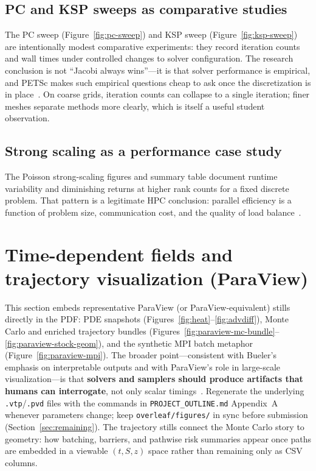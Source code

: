 \documentclass[11pt]{article}
\begin{document}
\subsection{PC and KSP sweeps as comparative studies}
The PC sweep (Figure~\ref{fig:pc-sweep}) and KSP sweep (Figure~\ref{fig:ksp-sweep})
are intentionally modest comparative experiments: they record iteration
counts and wall times under controlled changes to solver configuration. The
research conclusion is not ``Jacobi always wins''---it is that solver
performance is empirical, and PETSc makes such empirical questions cheap to ask
once the discretization is in place~\cite{bueler2020petsc,petsc-user-ref}. On coarse
grids, iteration counts can collapse to a single iteration; finer meshes separate
methods more clearly, which is itself a useful student observation.

\subsection{Strong scaling as a performance case study}
The Poisson strong-scaling figures and summary table document runtime variability
and diminishing returns at higher rank counts for a fixed discrete problem. That
pattern is a legitimate HPC conclusion: parallel efficiency is a function of problem
size, communication cost, and the quality of load balance~\cite{petsc-efficient}.

\section{Time-dependent fields and trajectory visualization (ParaView)}
This section embeds representative ParaView (or ParaView-equivalent) stills
directly in the PDF: PDE snapshots (Figures~\ref{fig:heat}--\ref{fig:advdiff}), Monte
Carlo and enriched trajectory bundles (Figures~\ref{fig:paraview-mc-bundle}--\ref{fig:paraview-stock-geom}),
and the synthetic MPI batch metaphor (Figure~\ref{fig:paraview-mpi}). The broader
point---consistent with Bueler's emphasis on interpretable outputs and with
ParaView's role in large-scale visualization---is that \textbf{solvers and samplers
should produce artifacts that humans can interrogate}, not only scalar
timings~\cite{bueler2020petsc,paraview-guide}. Regenerate the underlying
\texttt{.vtp}/\texttt{.pvd} files with the commands in \texttt{PROJECT\_OUTLINE.md}
Appendix~A whenever parameters change; keep \texttt{overleaf/figures/} in sync before
submission (Section~\ref{sec:remaining}).
The trajectory stills connect the Monte Carlo story to geometry: how
batching, barriers, and pathwise risk summaries appear once paths are embedded in a
viewable $(t,S,z)$ space rather than remaining only as CSV columns.
\end{document}
